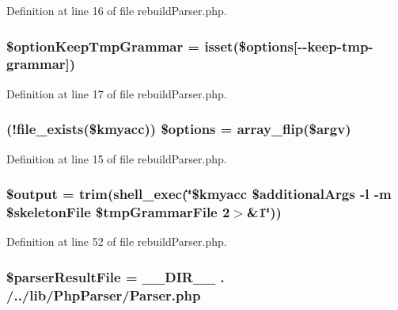 Definition at line 16 of file rebuild\+Parser.\+php.

\subsubsection[{\$option\+Keep\+Tmp\+Grammar}]{\setlength{\rightskip}{0pt plus 5cm}\$option\+Keep\+Tmp\+Grammar = isset(\${\bf options}[\textquotesingle{}-\/-\/keep-\/tmp-\/grammar\textquotesingle{}])}\label{rebuild_parser_8php_ad2d5e1d85cadf957af699ffbaca1cb23}


Definition at line 17 of file rebuild\+Parser.\+php.

\subsubsection[{\$options}]{ (!file\+\_\+exists(\$kmyacc)) \${\bf options} = array\+\_\+flip(\$argv)}\label{rebuild_parser_8php_ad485bdc644c889fcb77db6edc8323836}


Definition at line 15 of file rebuild\+Parser.\+php.

\subsubsection[{\$output}]{\setlength{\rightskip}{0pt plus 5cm}\$output = trim(shell\+\_\+exec(\char`\"{}\$kmyacc \$additional\+Args -\/l -\/m \$skeleton\+File \$tmp\+Grammar\+File 2$>$\&1\char`\"{}))}\label{rebuild_parser_8php_a73004ce9cd673c1bfafd1dc351134797}


Definition at line 52 of file rebuild\+Parser.\+php.

\subsubsection[{\$parser\+Result\+File}]{\setlength{\rightskip}{0pt plus 5cm}\$parser\+Result\+File = \+\_\+\+\_\+\+D\+I\+R\+\_\+\+\_\+ . \textquotesingle{}/../lib/Php\+Parser/Parser.\+php\textquotesingle{}}\label{rebuild_parser_8php_a6bee4175dfc0abe6d906bd2fb9e11777}


